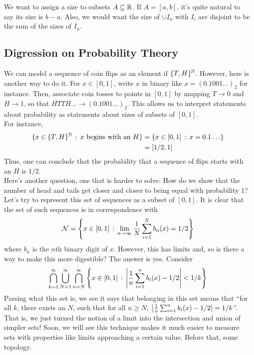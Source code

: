 
We want to assign a size to subsets $A \subseteq \mathbb{R}$. If $A = [a, b]$, it's quite natural to say its size is $b - a$. Also, we would want the size of $\cup I_{n}$ with $I_{i}$ are disjoint to be the sum of the sizes of $I_{n}$. 

\subsection*{Digression on Probability Theory}
\sectionspace

We can model a sequence of coin flips as an element if $\{T, H\}^{\mathbb{N}}$. However, here is another way to do it. For $x \in [0, 1]$, write $x$ in binary like $x = (0.1001\ldots)_{2}$ for instance. Then, associate coin tosses to points in $[0, 1]$ by mapping $T \to 0$ and $H \to 1$, so that $HTTH\ldots \to (0.1001\ldots)_{2}$. This allows us to interpret statements about probability as statements about sizes of subsets of $[0, 1]$.\\

For instance, 
\begin{align*}
    \{x \in \{T, H\}^{\mathbb{N}} \, :\, x \text{ begins with an }H\} &= \{x \in [0, 1] \, :\, x = 0.1\ldots\}\\
    &= [1/2, 1]
\end{align*}
Thus, one can conclude that the probability that a sequence of flips starts with an $H$ is $1/2$.\\

Here's another question, one that is harder to solve: How do we show that the number of head and tails get closer and closer to being equal with probability $1$? Let's try to represent this set of sequences as a subset of $[0, 1]$. It is clear that the set of such sequences is in correspondence with
\[ \mathcal{N} = \left\{x \in [0, 1] \, :\, \lim_{n \to \infty} \frac{1}{N}\sum_{i = 1}^{N} b_{n}(x) = 1/2\right\} \]
where $b_{n}$ is the $n$th binary digit of $x$. However, this has limits and, so is there a way to make this more digestible? The answer is yes. Consider
\[ \bigcap_{k = 1}^{\infty} \bigcup_{N = 1}^{\infty} \bigcap_{n = N}^{\infty} \left\{x \in [0, 1] \, :\, \left\lvert {\frac{1}{n}\sum_{i = 1}^{n} b_{i}(x) - 1/2} \right\rvert < 1/k\right\} \]
Parsing what this set is, we see it says that belonging in this set means that ``for all $k$, there exists an $N$, such that for all $n \geq N$, $\left\lvert {\frac{1}{n}\sum_{i = 1}^{n} b_{i}(x) - 1/2} \right\rvert = 1/k$''. That is, we just turned the notion of a limit into the intersection and union of simpler sets! Soon, we will see this technique makes it much easier to measure sets with properties like limits approaching a certain value. Before that, some topology.

